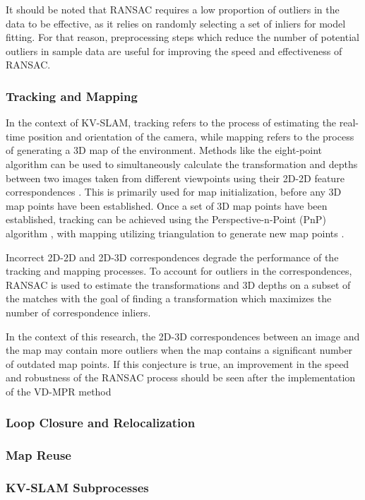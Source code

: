 It should be noted that RANSAC requires a low proportion of outliers in the data to be effective, as it relies on randomly selecting a set of inliers for model fitting. For that reason, preprocessing steps which reduce the number of potential outliers in sample data are useful for improving the speed and effectiveness of RANSAC.

\subsubsection{Tracking and Mapping}

In the context of KV-SLAM, tracking refers to the process of estimating the real-time position and orientation of the camera, while mapping refers to the process of generating a 3D map of the environment. Methods like the eight-point algorithm can be used to simultaneously calculate the transformation and depths between two images taken from different viewpoints using their 2D-2D feature correspondences \cite{longuet-higginsComputerAlgorithmReconstructing1981}\cite{hartleyDefenseEightpointAlgorithm1997}. This is primarily used for map initialization, before any 3D map points have been established. Once a set of 3D map points have been established, tracking can be achieved using the Perspective-n-Point (PnP) algorithm \cite{fischlerRandomSampleConsensus1981}, with mapping utilizing triangulation to generate new map points \cite{davisonRealtimeSimultaneousLocalisation2003}.

Incorrect 2D-2D and 2D-3D correspondences degrade the performance of the tracking and mapping processes. To account for outliers in the correspondences, RANSAC is used to estimate the transformations and 3D depths on a subset of the matches with the goal of finding a transformation which maximizes the number of correspondence inliers.

In the context of this research, the 2D-3D correspondences between an image and the map may contain more outliers when the map contains a significant number of outdated map points. If this conjecture is true, an improvement in the speed and robustness of the RANSAC process should be seen after the implementation of the VD-MPR method

\subsubsection{Loop Closure and Relocalization}

\subsubsection{Map Reuse}

\subsubsection{KV-SLAM Subprocesses}
